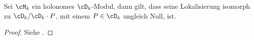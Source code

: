 \begin{thm} \label{thm:lokalHoloZuQuot}
Sei $\cM_k$ ein holonomes $\cD_k$-Modul, dann gilt, dass seine Lokalisierung
isomorph zu $\cD_k/\cD_k\cdot P$, mit einem $P\in \cD_k$ ungleich Null, ist.
\end{thm}
\begin{proof}
Siehe \cite[Cor 4.2.8]{sabbah_cimpa90}.
\end{proof}

\begin{comment}
\subsubsection{Alternative Definition B} %
\begin{defn} \cite[Def 3.3.1.]{sabbah_cimpa90}
Sei $\cM$ lineares Differentialsystem
(linear differential system) %
.  Man sagt, $\cM$ ist holonom, falls $\cM=0$ oder falls $\Car\cM\subset
\{x=0\}\cup{\xi=0}$.
\end{defn}
\begin{lem} \cite[Lem 3.3.8.]{sabbah_cimpa90}
Ein $\cD$-Modul ist holonom genau dann, wenn $\dim_{gr^F\cD,0}gr^F\cM=1$.
\end{lem}
\begin{proof}
Siehe \cite[Lem 3.3.8.]{sabbah_cimpa90}
\end{proof}
\end{comment}

\begin{comment}
\subsubsection{Alternative Definition A} %
\begin{defn}[Holonome $\cD$-Moduln]
\cite[Chap 10 §1]{coutinho1995primer}
Ein endlich generierter $\cD$-Modul $\cM$ ist \emph{holonom}, falls $\cM=0$
gilt, oder falls es die Dimension $1$ hat.
\end{defn}
\begin{bem}
\cite[Chap 10 §1]{coutinho1995primer}
Sei $\mathfrak{a}\neq 0$ ein Links-Ideal von $\cD$. Es gilt nach
\cite[Corollary 9.3.5]{coutinho1995primer}, dass $d(\cD/\mathfrak{a})\leq 1$.
Falls $\mathfrak{a}\neq\cD$, dann gilt nach der \emph{Bernstein's inequality}
\cite[Chap 9 §4]{coutinho1995primer}, dass $d(\cD/\mathfrak{a})=1$. Somit ist
$\cD/\mathfrak{a}$ ein holonomes $\cD$-Modul.
\end{bem}
\end{comment}


